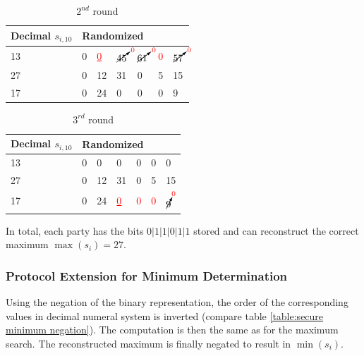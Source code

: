 \begin{table}[!htb]
	\centering
	\caption{$2^{nd}$ round} \label{table:secure maximum p1 not maximum}
	\begin{tabular}{|l|l|l|l|l|l|l|}
		\hline
		Decimal $s_{i,10}$ & \multicolumn{6}{l|}{Randomized} \\ \hline
		13                 & 0    & \textcolor{red}{\underline{0}}    & $\cancelto{\textcolor{red}{0}}{45}$    & $\cancelto{\textcolor{red}{0}}{61}$    & \textcolor{red}{0}   & $\cancelto{\textcolor{red}{0}}{57}$   \\ \hline
		27                 & 0    & 12    & 31    & 0    & 5   & 15   \\ \hline
		17                 & 0    & 24    & 0    & 0    & 0   & 9   \\ \hline
	\end{tabular}
\end{table}

\begin{table}[!htb]
	\centering
	\caption{$3^{rd}$ round} \label{table:secure maximum p3 not maximum}
	\begin{tabular}{|l|l|l|l|l|l|l|}
		\hline
		Decimal $s_{i,10}$ & \multicolumn{6}{l|}{Randomized} \\ \hline
		13                 & 0    & 0    & 0    & 0    & 0   & 0   \\ \hline
		27                 & 0    & 12    & 31    & 0    & 5   & 15   \\ \hline
		17                 & 0    & 24    & \textcolor{red}{\underline{0}}    & \textcolor{red}{0}    & \textcolor{red}{0}   & $\cancelto{\textcolor{red}{0}}{9}$   \\ \hline
	\end{tabular}
\end{table}

In total, each party has the bits $0|1|1|0|1|1$ stored and can reconstruct the correct maximum $\max(s_i)=27$.

\subsubsection{Protocol Extension for Minimum Determination} \label{Protocol Extension for Minimum Determination}

Using the negation of the binary representation, the order of the corresponding values in decimal numeral system is inverted (compare table \ref{table:secure minimum negation}). The computation is then the same as for the maximum search. The reconstructed maximum is finally negated to result in $\min(s_i)$.

